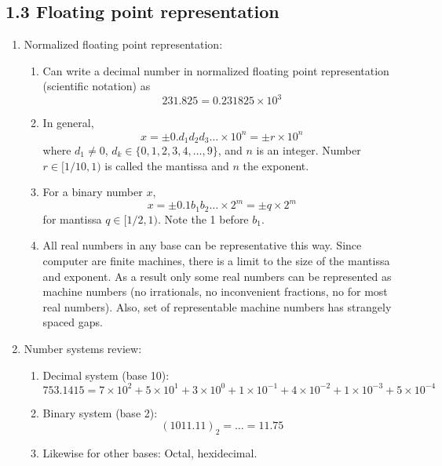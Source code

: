 \documentclass{article}
\theoremstyle{remark}
\begin{document}
\subsection{1.3 Floating point representation}

\begin{enumerate}
\item Normalized floating point representation:
\begin{enumerate}
\item Can write a decimal number in normalized floating point representation (scientific notation) as
\[
231.825 = 0.231825 \times 10^3
\]
\item In general, 
\[
x = \pm 0.d_1 d_2 d_3 \dots \times 10^n = \pm r \times 10^n
\]
where $d_1 \neq 0$, $d_k \in \{0,1,2,3,4,\dots,9\}$, and $n$ is an integer. Number $r \in [1/10,1)$ is called the mantissa and $n$ the exponent.
\item For a binary number $x$, 
\[
x = \pm 0.1b_1 b_2 \dots \times 2^m = \pm q \times 2^m
\]
for mantissa $q \in [1/2, 1)$. Note the 1 before $b_1$.
\item All real numbers in any base can be representative this way. Since computer are finite machines, there is a limit to the size of the mantissa and exponent. As a result only some real numbers can be represented as machine numbers (no irrationals, no inconvenient fractions, no for most real numbers). Also, set of representable machine numbers has strangely spaced gaps.

\end{enumerate}

\item Number systems review:
\begin{enumerate}
\item Decimal system (base 10): 
\[
753.1415 = 7\times 10^2 + 5\times 10^1 + 3\times 10^0 + 1\times 10^{-1} +4\times 10^{-2} +1\times 10^{-3} +5\times 10^{-4}
\]
\item Binary system (base 2): 
\[
(1011.11)_2 = \dots = 11.75
\]
\item Likewise for other bases: Octal, hexidecimal.


\end{enumerate}
\end{enumerate}
\end{document}
